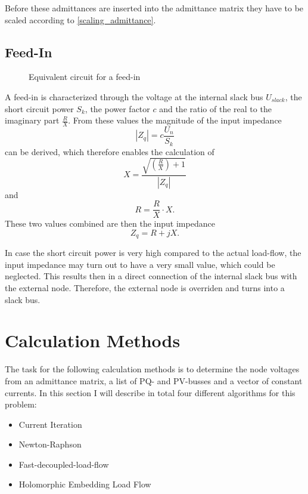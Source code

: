 Before these admittances are inserted into the admittance matrix they have to be scaled according to \eqref{scaling_admittance}.

\subsection{Feed-In}

\begin{figure}
	\centering
	
	\caption{Equivalent circuit for a feed-in}
	\label{fig:feedin}
\end{figure}

A feed-in  is characterized through the voltage at the internal slack bus $U_{slack}$, the short circuit power $S_k$, the power factor $c$ and the ratio of the real to the imaginary part $\frac{R}{X}$. From these values the magnitude of the input impedance 
\begin{equation}
	|Z_q| = c \frac{U_n}{S_k}
\end{equation}
can be derived, which therefore enables the calculation of
\begin{equation}
	X = \frac{\sqrt{\left( \frac{R}{X} \right) + 1}}{|Z_q|}
\end{equation}
and
\begin{equation}
	R = \frac{R}{X} \cdot X.
\end{equation}
These two values combined are then the input impedance
\begin{equation}
	Z_q = R + j X.
\end{equation}

In case the short circuit power is very high compared to the actual load-flow, the input impedance may turn out to have a very small value, which could be neglected. This results then in a direct connection of the internal slack bus with the external node. Therefore, the external node is overriden and turns into a slack bus.

\section{Calculation Methods}

The task for the following calculation methods is to determine the node voltages from an admittance matrix, a list of PQ- and PV-busses and a vector of constant currents. In this section I will describe in total four different algorithms for this problem:
\begin{itemize}
	\item Current Iteration \citep[p. 209]{powerSystemAnalysis}
	\item Newton-Raphson \citep[p. 232]{powerSystemAnalysis}
	\item Fast-decoupled-load-flow \citep[p. 240]{powerSystemAnalysis}
	\item Holomorphic Embedding Load Flow \citep{helmIEEE, helmPatentApr2009, helmPatentSept2009}
\end{itemize}

